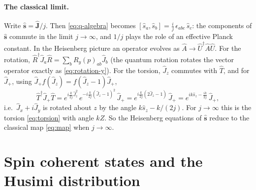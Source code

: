 \documentclass[11pt,a4paper]{article}
\newcommand{\vJ}{\bm{J}}
\begin{document}
\paragraph{The classical limit.} Write $\hat{\bm s} = \hat{\vJ}/j$. Then \eqref{eq:q-algebra} becomes $[\hat s_a, \hat
s_b] = \frac{i}{j}\,\epsilon_{abc}\,\hat s_c$: the components of $\hat{\bm s}$ commute in the limit $j\to\infty$, and
$1/j$ plays the role of an effective Planck constant. In the Heisenberg picture an operator evolves as $\hat A \to
\hat U^\dagger\hat A\hat U$. For the rotation, $\hat R^\dagger\hat J_a\hat R = \sum_b R_y(p)_{ab}\hat J_b$ (the quantum
rotation rotates the vector operator exactly as \eqref{eq:rotation-y}). For the torsion, $\hat J_z$ commutes with $\hat T$,
and for $\hat J_+$, using $\hat J_+ f(\hat J_z) = f(\hat J_z - 1)\hat J_+$,
\begin{equation*}
  \hat T^\dagger\hat J_+\hat T = e^{i\frac{k}{2j}\hat J_z^2}\,e^{-i\frac{k}{2j}(\hat J_z-1)^2}\,\hat J_+
  = e^{i\frac{k}{2j}(2\hat J_z - 1)}\,\hat J_+ = e^{ik\hat s_z - \frac{ik}{2j}}\,\hat J_+ ,
\end{equation*}
i.e.\ $\hat J_x + i\hat J_y$ is rotated about $z$ by the angle $k\hat s_z - k/(2j)$. For $j\to\infty$ this is the
torsion \eqref{eq:torsion} with angle $kZ$. So the Heisenberg equations of $\hat{\bm s}$ reduce to the classical map
\eqref{eq:map} when $j\to\infty$.

\section{Spin coherent states and the Husimi distribution}\label{sec:coherent}
\end{document}
